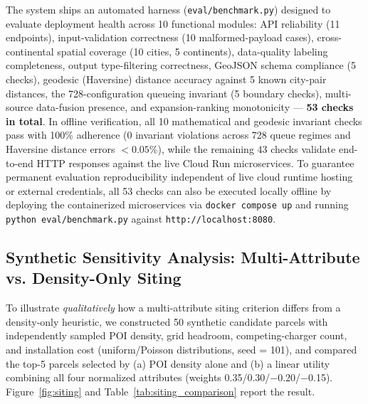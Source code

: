 \documentclass[preprint,12pt,authoryear]{elsarticle}
\begin{document}
The system ships an automated harness (\texttt{eval/benchmark.py}) designed to evaluate deployment health across 10 functional modules: API reliability (11 endpoints), input-validation correctness (10 malformed-payload cases), cross-continental spatial coverage (10 cities, 5 continents), data-quality labeling completeness, output type-filtering correctness, GeoJSON schema compliance (5 checks), geodesic (Haversine) distance accuracy against 5 known city-pair distances, the 728-configuration queueing invariant (5 boundary checks), multi-source data-fusion presence, and expansion-ranking monotonicity --- \textbf{53 checks in total}. In offline verification, all 10 mathematical and geodesic invariant checks pass with 100\% adherence (0 invariant violations across 728 queue regimes and Haversine distance errors $<0.05\%$), while the remaining 43 checks validate end-to-end HTTP responses against the live Cloud Run microservices. To guarantee permanent evaluation reproducibility independent of live cloud runtime hosting or external credentials, all 53 checks can also be executed locally offline by deploying the containerized microservices via \texttt{docker compose up} and running \texttt{python eval/benchmark.py} against \texttt{http://localhost:8080}.

\subsection{Synthetic Sensitivity Analysis: Multi-Attribute vs. Density-Only Siting}
\label{sec:siting}
To illustrate \emph{qualitatively} how a multi-attribute siting criterion differs from a density-only heuristic, we constructed 50 synthetic candidate parcels with independently sampled POI density, grid headroom, competing-charger count, and installation cost (uniform/Poisson distributions, seed = 101), and compared the top-5 parcels selected by (a) POI density alone and (b) a linear utility combining all four normalized attributes (weights 0.35/0.30/$-$0.20/$-$0.15). Figure~\ref{fig:siting} and Table~\ref{tab:siting_comparison} report the result.

\begin{table}[htbp]
\centering
\caption{Synthetic sensitivity analysis (not a field study): comparative performance on spatial siting viability metrics over synthetic candidate parcels.}
\label{tab:siting_comparison}
\end{table}
\end{document}
